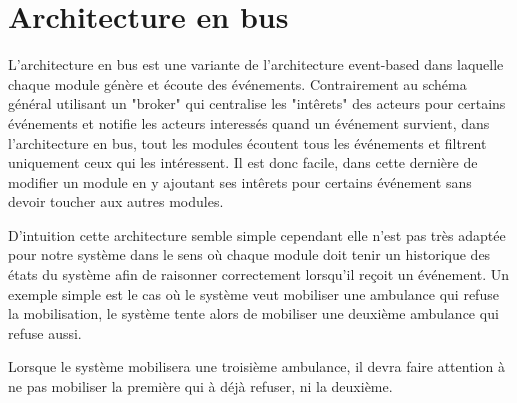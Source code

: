 
\section{Architecture en bus}
	L'architecture en bus est une variante de l'architecture event-based dans
	laquelle chaque module génère et écoute des événements.  Contrairement au
	schéma général utilisant un "broker" qui centralise les "intêrets" des
	acteurs pour certains événements et notifie les acteurs interessés quand un
	événement survient, dans l'architecture en bus, tout les modules écoutent
	tous les événements et filtrent uniquement ceux qui les intéressent. Il est
	donc facile, dans cette dernière de modifier un module en y ajoutant ses
	intêrets pour certains événement sans devoir toucher aux autres modules.

	D'intuition cette architecture semble simple cependant elle n'est pas très
	adaptée pour notre système dans le sens où chaque module doit tenir un
	historique des états du système afin de raisonner correctement lorsqu'il
	reçoit un événement.  Un exemple simple est le cas où le système veut
	mobiliser une ambulance qui refuse la mobilisation, le système tente alors
	de mobiliser une deuxième ambulance qui refuse aussi. 

	Lorsque le système mobilisera une troisième ambulance, il devra faire
	attention à ne pas mobiliser la première qui à déjà refuser, ni la
	deuxième.
